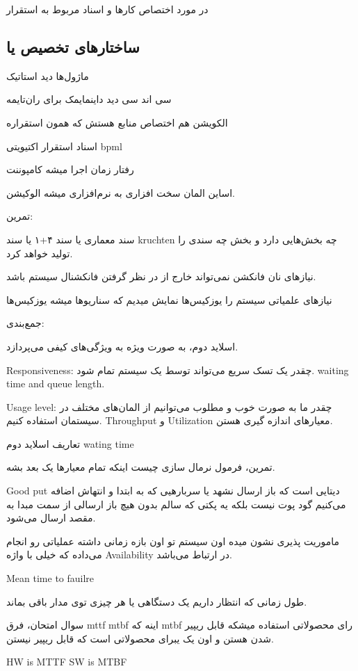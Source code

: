 در مورد اختصاص کار‌ها و اسناد مربوط به استقرار

\subsection{ساختار‌های تخصیص یا }

ماژول‌ها دید استاتیک

سی اند سی دید داینمایمک برای ران‌تایمه

الکویشن هم اختصاص منابع هستش که همون استقراره

اسناد
استقرار
اکتیویتی
bpml

رفتار زمان اجرا میشه کامپوننت

اساین المان سخت افزاری به نرم‌افزاری میشه الوکیشن.

تمرین:

سند معماری یا سند ۴+۱ یا سند kruchten چه بخش‌هایی دارد و بخش چه سندی را تولید
خواهد کرد.

نیاز‌های نان فانکشن نمی‌تواند خارج از در نظر گرفتن فانکشنال سیستم باشد.

نیاز‌های علمیاتی سیستم را یوزکیس‌ها نمایش میدیم که سناریو‌ها میشه یوزکیس‌ها

جمع‌بندی:

اسلاید دوم، به صورت ویژه به ویژگی‌های کیفی می‌پردازد.

Responsiveness: چقدر یک تسک سریع می‌تواند توسط یک سیستم تمام شود. waiting time
and queue length.

Usage level: چقدر ما به صورت خوب و مطلوب می‌توانیم از المان‌های مختلف در سیستمان
استفاده کنیم. Throughput و Utilization معیار‌های اندازه گیری هستن.

تعاریف اسلاید دوم wating time

تمرین، فرمول نرمال سازی چیست اینکه تمام معیار‌ها یک بعد بشه.

Good put دیتایی است که باز ارسال نشهد یا سربارهیی که به ابتدا و انتهاش اضافه
می‌کنیم گود پوت نیست بلکه یه پکتی که سالم بدون هیچ باز ارسالی از سمت مبدا به
مقصد ارسال می‌شود.

ماموریت پذیری نشون میده اون سیستم تو اون بازه زمانی داشته عملیاتی رو انجام
می‌داده که خیلی با واژه Availability در ارتباط می‌باشد.

Mean time to fauilre

طول زمانی که انتظار داریم یک دستگاهی یا هر چیزی توی مدار باقی بماند.

سوال امتحان، فرق mttf mtbf اینه که mtbf رای محصولاتی استفاده میشکه قابل ریپیر
شدن هستن و اون یک یبرای محصولاتی است که قابل ریپیر نیستن.

HW is MTTF
SW is MTBF

